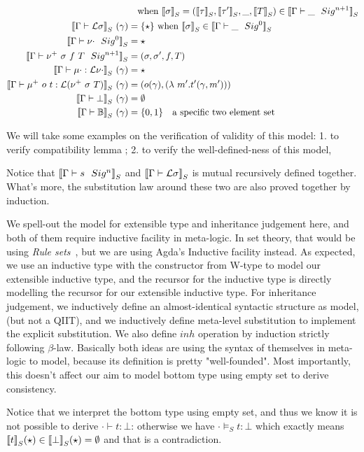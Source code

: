 \begin{align*}
  & \quad \text{when } \denotesS{\sigma} = (\denotesS{\tau}, \denotesS{\tau'}, \_ , \denotesS{T}) \in \denotesS{\goodSig{\Gamma}{\_}{n+1}} \\
  \denotesS{\goodType{\Gamma}{\cL \sigma}{i}} \ (\gamma)&= \{\star\} \text{ when } \denotesS{\sigma} \in \denotesS{\goodSig{\Gamma}{\_}{0}} \\
  \denotesS{\goodSig{\Gamma}{\nu\cdot}{0}} &= \star \\
  \denotesS{\goodSig{\Gamma}{\nu^+ \ \sigma \ f \ T}{n+1}} &= (\sigma, \sigma', f, T) \\
  \denotesS{\goodTerm{\Gamma}{\mu\cdot}{\cL \nu\cdot} } \ (\gamma) &= \star \\
  \denotesS{\goodTerm{\Gamma}{\mu^+ \ o \ t}{\cL(\nu^+ \ \sigma  \ T)}} \ (\gamma)&= (o(\gamma), (\lambda \ m' . t'(\gamma, m'))) \\
  \denotesS{\goodType{\Gamma}{\bot}{i}} \ (\gamma) &= \emptyset \\
  \denotesS{\goodType{\Gamma}{\cB}{i}} \ (\gamma) &= \{0, 1\} \quad \text{a specific two element set} \\
\end{align*}


We will take some examples on the verification of validity of this model: 1. to verify compatibility lemma ; 2. to verify the well-defined-ness of this model,  

Notice that $\denotesS{\goodSig{\Gamma}{s}{n}}$ and $\denotesS{\goodType{\Gamma}{\cL\sigma}{i}}$ is mutual recursively defined together. What's more, the substitution law around these two are also proved together by induction.

We spell-out the model for extensible type and inheritance judgement here, and both of them require inductive facility in meta-logic. In set theory, that would be using \textit{Rule sets}~\citep{timany2017consistency,aczel1998relating}, but we are using Agda's Inductive facility instead. 
As expected, we use an inductive type with the constructor from W-type to model our extensible inductive type, and the recursor for the inductive type is directly modelling the recursor for our extensible inductive type. For inheritance judgement, we inductively define an almost-identical syntactic structure as model, (but not a QIIT), and we inductively define meta-level substitution to implement the explicit substitution. We also define $inh$ operation by induction strictly following $\beta$-law. Basically both ideas are using the syntax of themselves in meta-logic to model, because its definition is pretty "well-founded". Most importantly, this doesn't affect our aim to model bottom type using empty set to derive consistency.



Notice that we interpret the bottom type using empty set, and thus we know it is not possible to derive $\cdot \vdash t : \bot$: otherwise we have $\cdot \models_S t : \bot$ which exactly means $\denotesS{t}(\star) \in \denotesS{\bot}(\star) = \emptyset$ 
and that is a contradiction.